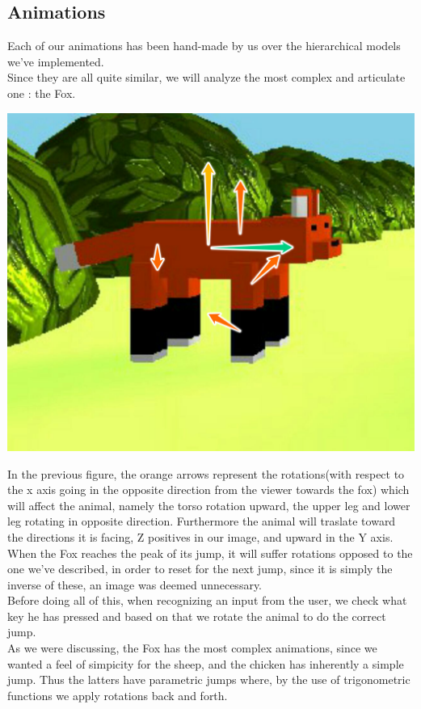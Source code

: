 \documentclass[a4paper, 11pt]{article}
\begin{document}
\subsection{Animations}
Each of our animations has been hand-made by us over the hierarchical models we've implemented.\\
Since they are all quite similar, we will analyze the most complex and articulate one : the Fox.\\
\begin{center}
	\includegraphics[scale=0.22]{FoxAnimation.jpeg}\\
\end{center}
In the previous figure, the orange arrows represent the rotations(with respect to the x axis going in the opposite direction from the viewer towards the fox) which will affect the animal, namely the torso rotation upward, the upper leg and lower leg rotating in opposite direction. Furthermore the animal will traslate toward the directions it is facing, Z positives in our image, and upward in the Y axis.\\ When the Fox reaches the peak of its jump, it will suffer rotations opposed to the one we've described, in order to reset for the next jump, since it is simply the inverse of these, an image was deemed unnecessary.\\
Before doing all of this, when recognizing an input from the user, we check what key he has pressed and based on that we rotate the animal to do the correct jump.\\
As we were discussing, the Fox has the most complex animations, since we wanted a feel of simpicity for the sheep, and the chicken has inherently a simple jump. Thus the latters have parametric jumps where, by the use of trigonometric functions we apply rotations back and forth.\\
\end{document}
